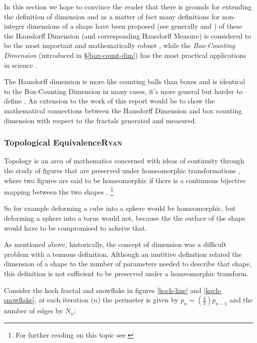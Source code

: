 \documentclass[a4paper,11pt,twoside]{article}
\begin{document}
In this section we hope to convince the reader that there is grounds for
extending the definition of dimension and as a matter of fact many definitions
for non-integer dimensions of a shape have been proposed (see generally
\cite[Ch. 39]{mandelbrotFractalGeometryNature1982} and
\cite[\S 1.3]{gouyetPhysicsFractalStructures1996}) of these the Hausdorff Dimension (and corresponding Hausdorff Measure) is
considered to be the most important and mathematically robust
\cite[p. 27]{falconerFractalGeometryMathematical2003b}, while the \emph{Box-Counting Dimension} (introduced in \S \ref{box-count-dim})
has the most practical applications in science
\cite[p. 192]{peitgenChaosFractalsNew2004}.

The Hausdorff dimension is more like counting balls than boxes and is identical
to the Box-Counting Dimension in many cases, it's more general but harder to define
\cite{sandersonFractalsAreTypically2017}, An extension to the work of this report
would be to show the mathematical connections between the Hausdorff Dimension
and box counting dimension with respect to the fractals generated and measured.


\subsubsection{Topological Equivalence\hfill{}\textsc{Ryan}}
\label{topological-equivalence}
Topology is an area of mathematics concerned with ideas of continuity through the study of figures that are preserved under homeomorphic transformations \cite{gilmoreTopologyChaosAlice2002} , where two figures are said to be homeomorphic if there is a continuous bijective mapping between the two shapes \cite[p. 105]{peitgenChaosFractalsNew2004}
.
\footnote{For further reading on this topic see \cite[p. 106]{peitgenChaosFractalsNew2004}}

So for example deforming a cube into a sphere would be homeomorphic, but deforming a sphere into a torus would not, because the the surface of the shape would have to be compromised to acheive that.

As mentioned above, historically, the concept of dimension was a difficult problem with a tenuous
definition.  Although an inutitive definition related the dimension of a shape to
the number of parameters needed to describe that shape, this definition is not
sufficient to be preserved under a homeomorphic transform.

Consider the koch fractal and snowflake in figures \ref{koch-line} and \ref{koch-snowflake}, at each iteration (\(n\)) the perimeter is given by \(p_{n}= \left(\frac{4}{3} \right)p_{n-1}\) and the number of edges by \(N_{n}\):
\end{document}
